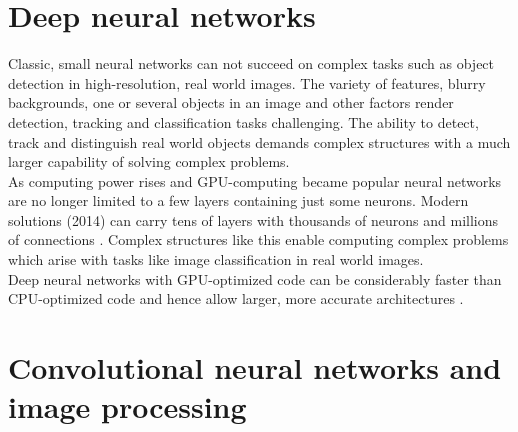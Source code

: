 \documentclass[12pt,twoside]{article}
\theoremstyle{plain}
\theoremstyle{definition}
\theoremstyle{remark}
\begin{document}
\section{Deep neural networks}
\label{sec:dnn}

Classic, small neural networks can not succeed on complex tasks such as object detection in high-resolution, real world images. The variety of features, blurry backgrounds, one or several objects in an image and other factors render detection, tracking and classification tasks challenging. The ability to detect, track and distinguish real world objects demands complex structures with a much larger capability of solving complex problems.
\\
As computing power rises and GPU-computing became popular neural networks are no longer limited to a few layers containing just some neurons. Modern solutions (2014) can carry tens of layers with thousands of neurons and millions of connections \cite{GoogleLargeScaleVideoClassification-Karpathy}. Complex structures like this enable computing complex problems which arise with tasks like image classification in real world images.
\\
Deep neural networks with GPU-optimized code can be considerably faster than CPU-optimized code and hence allow larger, more accurate architectures \cite{MultiColumnDeepNeuralNetworksClassification-Ciresan}.





\section{Convolutional neural networks and image processing}
\label{sec:cnn}
\end{document}
